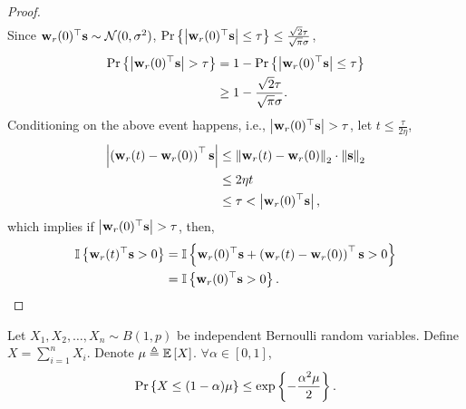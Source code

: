 \begin{proof}
\begin{equation*}
\begin{split}
\end{split}
\end{equation*}
Since ${\mathbf{w}}_r(0)^\top {\mathbf{s}} \sim {\mathcal{N}}(0, \sigma^2)$, ${\text{Pr}}\left\{ \left| {\mathbf{w}}_r(0)^\top {\mathbf{s}} \right| \le \tau\right\} \le  \frac{\sqrt{2}\tau}{\sqrt{\pi}\sigma}$,
\begin{equation*}
\begin{split}
	{\text{Pr}}\left\{ \left| {\mathbf{w}}_r(0)^\top {\mathbf{s}} \right| > \tau\right\} &= 1 - {\text{Pr}}\left\{ \left| {\mathbf{w}}_r(0)^\top {\mathbf{s}} \right| \le \tau\right\} \\
	&\ge 1 - \frac{\sqrt{2}\tau}{\sqrt{\pi}\sigma}.
\end{split}
\end{equation*}
Conditioning on the above event happens, i.e., $ \left| {\mathbf{w}}_r(0)^\top {\mathbf{s}} \right| > \tau$, let $t \le \frac{\tau}{ 2 \eta }$,
\begin{equation*}
\begin{split}
	\left| \left( {\mathbf{w}}_r(t) - {\mathbf{w}}_r(0) \right)^\top {\mathbf{s}} \right| &\le \left\| {\mathbf{w}}_r(t) - {\mathbf{w}}_r(0) \right\|_2 \cdot \left\| {\mathbf{s}} \right\|_2 \\
	&\le 2 \eta t \\
	&\le \tau < \left| {\mathbf{w}}_r(0)^\top {\mathbf{s}} \right|,
\end{split}
\end{equation*}
which implies if $\left| {\mathbf{w}}_r(0)^\top {\mathbf{s}} \right| > \tau$, then,
\begin{equation*}
\begin{split}
	{\mathbb{I}}\left\{ {\mathbf{w}}_r(t)^\top {\mathbf{s}} > 0 \right\} &= {\mathbb{I}}\left\{ {\mathbf{w}}_r(0)^\top {\mathbf{s}}  + \left( {\mathbf{w}}_r(t) - {\mathbf{w}}_r(0) \right)^\top {\mathbf{s}} > 0 \right\} \\
	&= {\mathbb{I}}\left\{ {\mathbf{w}}_r(0)^\top {\mathbf{s}} > 0 \right\}. \qedhere
\end{split}
\end{equation*}
\end{proof}

\begin{lem}[Chernoff]
\label{lem:chernoff}
    Let $X_1, X_2, \dots, X_n \sim B(1, p)$ be independent Bernoulli random variables. Define $X = \sum\limits_{i=1}^{n}{ X_i  }$. Denote $\mu \triangleq {\mathbb{E}}\left[ X \right]$. $\forall \alpha \in [0,1]$,
\begin{equation*}
    {\text{Pr}}\left\{ X \le (1 - \alpha) \mu \right\} \le \exp\left\{ - \frac{\alpha^2 \mu}{2} \right\}.
\end{equation*}
\end{lem}

